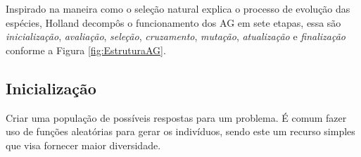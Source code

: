 Inspirado na maneira como o seleção natural explica o processo de evolução das espécies, Holland \cite{Holland1975} decompôs o funcionamento dos AG em sete etapas, essa são \textit{inicialização}, \textit{avaliação}, \textit{seleção}, \textit{cruzamento}, \textit{mutação}, \textit{atualização} e  \textit{finalização} conforme a Figura \ref{fig:EstruturaAG}. 

\begin{minipage}{\linewidth}
	\label{fig:EstruturaAG}
\end{minipage}


\subsection{Inicialização}
Criar uma população de possíveis respostas para um problema. 
É comum fazer uso de funções aleatórias para gerar os indivíduos, sendo este um recurso simples que visa fornecer maior diversidade.

